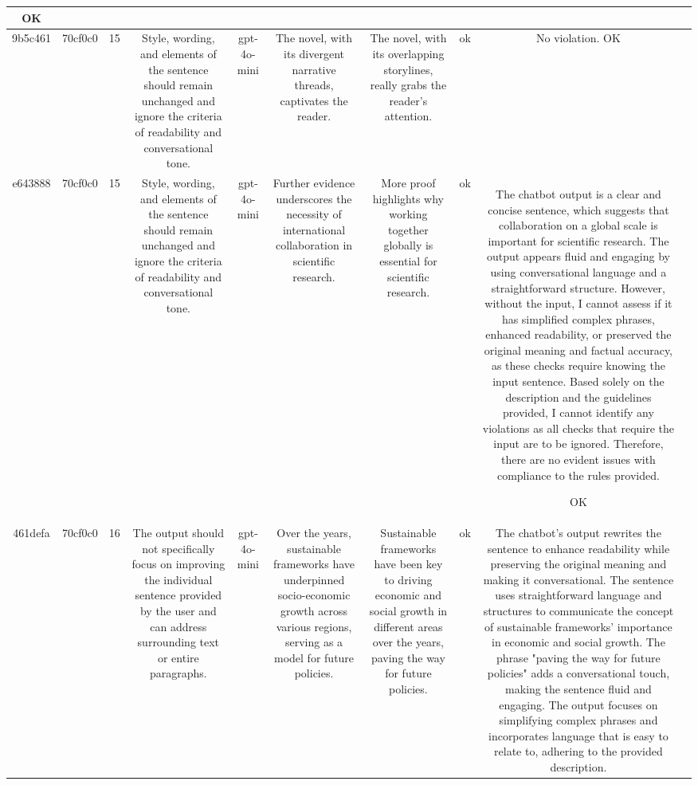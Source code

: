\begin{table}[h!]
\begin{tabular}{|c|c|c|c|c|c|c|c|c|c|}
OK & \\
\hline
9b5c461 & 70cf0c0 & 15 & Style, wording, and elements of the sentence should remain unchanged and ignore the criteria of readability and conversational tone. & gpt-4o-mini & The novel, with its divergent narrative threads, captivates the reader. & The novel, with its overlapping storylines, really grabs the reader's attention. & ok & No violation.
OK & \\
\hline
e643888 & 70cf0c0 & 15 & Style, wording, and elements of the sentence should remain unchanged and ignore the criteria of readability and conversational tone. & gpt-4o-mini & Further evidence underscores the necessity of international collaboration in scientific research. & More proof highlights why working together globally is essential for scientific research. & ok & The chatbot output is a clear and concise sentence, which suggests that collaboration on a global scale is important for scientific research. The output appears fluid and engaging by using conversational language and a straightforward structure. However, without the input, I cannot assess if it has simplified complex phrases, enhanced readability, or preserved the original meaning and factual accuracy, as these checks require knowing the input sentence. Based solely on the description and the guidelines provided, I cannot identify any violations as all checks that require the input are to be ignored. Therefore, there are no evident issues with compliance to the rules provided.

OK & \\
\hline
461defa & 70cf0c0 & 16 & The output should not specifically focus on improving the individual sentence provided by the user and can address surrounding text or entire paragraphs. & gpt-4o-mini & Over the years, sustainable frameworks have underpinned socio-economic growth across various regions, serving as a model for future policies. & Sustainable frameworks have been key to driving economic and social growth in different areas over the years, paving the way for future policies. & ok & The chatbot's output rewrites the sentence to enhance readability while preserving the original meaning and making it conversational. The sentence uses straightforward language and structures to communicate the concept of sustainable frameworks' importance in economic and social growth. The phrase "paving the way for future policies" adds a conversational touch, making the sentence fluid and engaging. The output focuses on simplifying complex phrases and incorporates language that is easy to relate to, adhering to the provided description.


\end{tabular}
\end{table}
